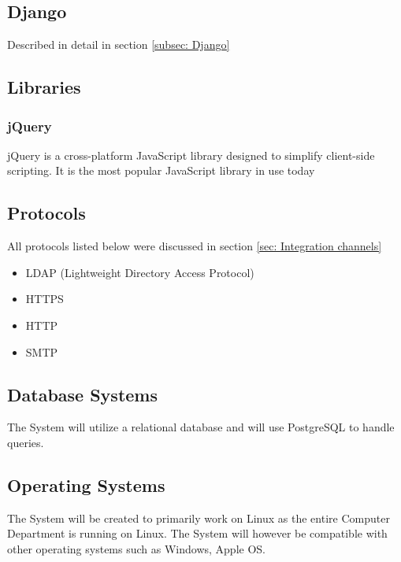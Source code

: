 \documentclass[12pt, letterpaper, twoside]{article}
\begin{document}
		\subsection{Django}
			Described in detail in section \ref{subsec: Django}
			
	\subsection{Libraries}
			\subsubsection{jQuery}
			jQuery is a cross-platform JavaScript library designed to simplify client-side scripting. It is the most popular JavaScript library in use today
	
	\subsection{Protocols}
		All protocols listed below were discussed in section \ref{sec: Integration channels}
			\begin{itemize}
				\item LDAP (Lightweight Directory Access Protocol)
				\item HTTPS
				\item HTTP
				\item SMTP	
			\end{itemize}
	
	\subsection{Database Systems}
		The System will utilize a relational database and will use PostgreSQL to handle queries.
		
	\subsection{Operating Systems}
		The System will be created to primarily work on Linux as the entire Computer Department is running on Linux. The System will however be compatible with other operating systems such as Windows, Apple OS.
		
	\
\end{document}
